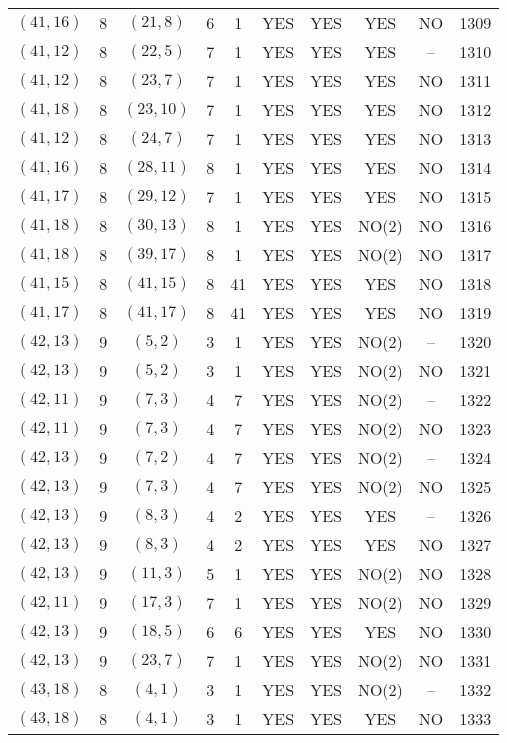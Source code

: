 \begin{longtable}{|c|c|c|c|c|c|c|c|c|c|}
$(41, 16)$ & 8 & $(21, 8)$ & 6 & 1 & YES & YES & YES & NO & 1309\\
$(41, 12)$ & 8 & $(22, 5)$ & 7 & 1 & YES & YES & YES & -- & 1310\\
$(41, 12)$ & 8 & $(23, 7)$ & 7 & 1 & YES & YES & YES & NO & 1311\\
$(41, 18)$ & 8 & $(23, 10)$ & 7 & 1 & YES & YES & YES & NO & 1312\\
$(41, 12)$ & 8 & $(24, 7)$ & 7 & 1 & YES & YES & YES & NO & 1313\\
$(41, 16)$ & 8 & $(28, 11)$ & 8 & 1 & YES & YES & YES & NO & 1314\\
$(41, 17)$ & 8 & $(29, 12)$ & 7 & 1 & YES & YES & YES & NO & 1315\\
$(41, 18)$ & 8 & $(30, 13)$ & 8 & 1 & YES & YES & NO(2) & NO & 1316\\
$(41, 18)$ & 8 & $(39, 17)$ & 8 & 1 & YES & YES & NO(2) & NO & 1317\\
$(41, 15)$ & 8 & $(41, 15)$ & 8 & 41 & YES & YES & YES & NO & 1318\\
$(41, 17)$ & 8 & $(41, 17)$ & 8 & 41 & YES & YES & YES & NO & 1319\\
$(42, 13)$ & 9 & $(5, 2)$ & 3 & 1 & YES & YES & NO(2) & -- & 1320\\
$(42, 13)$ & 9 & $(5, 2)$ & 3 & 1 & YES & YES & NO(2) & NO & 1321\\
$(42, 11)$ & 9 & $(7, 3)$ & 4 & 7 & YES & YES & NO(2) & -- & 1322\\
$(42, 11)$ & 9 & $(7, 3)$ & 4 & 7 & YES & YES & NO(2) & NO & 1323\\
$(42, 13)$ & 9 & $(7, 2)$ & 4 & 7 & YES & YES & NO(2) & -- & 1324\\
$(42, 13)$ & 9 & $(7, 3)$ & 4 & 7 & YES & YES & NO(2) & NO & 1325\\
$(42, 13)$ & 9 & $(8, 3)$ & 4 & 2 & YES & YES & YES & -- & 1326\\
$(42, 13)$ & 9 & $(8, 3)$ & 4 & 2 & YES & YES & YES & NO & 1327\\
$(42, 13)$ & 9 & $(11, 3)$ & 5 & 1 & YES & YES & NO(2) & NO & 1328\\
$(42, 11)$ & 9 & $(17, 3)$ & 7 & 1 & YES & YES & NO(2) & NO & 1329\\
$(42, 13)$ & 9 & $(18, 5)$ & 6 & 6 & YES & YES & YES & NO & 1330\\
$(42, 13)$ & 9 & $(23, 7)$ & 7 & 1 & YES & YES & NO(2) & NO & 1331\\
$(43, 18)$ & 8 & $(4, 1)$ & 3 & 1 & YES & YES & NO(2) & -- & 1332\\
$(43, 18)$ & 8 & $(4, 1)$ & 3 & 1 & YES & YES & YES & NO & 1333\\

\end{longtable}
